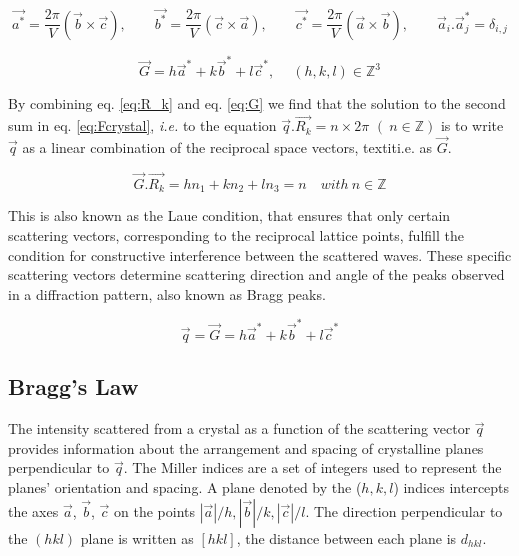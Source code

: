 \begin{equation}
    \vec{a^*}=\frac{2\pi}{V}(\vec{b}\times \vec{c}), \qquad
    \vec{b^*}=\frac{2\pi}{V}(\vec{c}\times \vec{a}), \qquad
    \vec{c^*}=\frac{2\pi}{V}(\vec{a}\times \vec{b}), \qquad
    \vec{a}_i . \vec{a}_j^* = \delta_{i,j}
\end{equation}

\begin{equation}
    \label{eq:G}
    \vec{G}=h\vec{a}^* + k\vec{b}^* + l\vec{c}^*, \quad \ (h,k,l) \in \mathbb{Z}^3
\end{equation}

By combining eq. \ref{eq:R_k} and eq. \ref{eq:G} we find that the solution to the second sum in eq. \ref{eq:Fcrystal}, \textit{i.e.} to the equation $\vec{q}.\vec{R_k} = n \times 2\pi$ $(\ n \in \mathbb{Z})$ is to write $\vec{q}$ as a linear combination of the reciprocal space vectors, textit{i.e.} as $\vec{G}$.

\begin{equation}
    \label{eq:LaueCond}
    \vec{G} . \vec{R_k} = hn_1 + kn_2 + ln_3 = n \quad  with \ n \in \mathbb{Z}
\end{equation}

This is also known as the Laue condition, that ensures that only certain scattering vectors, corresponding to the reciprocal lattice points, fulfill the condition for constructive interference between the scattered waves.
These specific scattering vectors determine scattering direction and angle of the peaks observed in a diffraction pattern, also known as Bragg peaks.

\begin{equation}
    \vec{q} = \vec{G}  = h\vec{a}^* + k\vec{b}^* + l\vec{c}^*
\end{equation}

\subsection{Bragg's Law}

The intensity scattered from a crystal as a function of the scattering vector $\vec{q}$ provides information about the arrangement and spacing of crystalline planes perpendicular to $\vec{q}$.
The Miller indices are a set of integers used to represent the planes' orientation and spacing.
A plane denoted by the ($h, k, l$) indices intercepts the axes $\vec{a}$, $\vec{b}$, $\vec{c}$ on the points $|\vec{a}|/h, |\vec{b}|/k, |\vec{c}|/l$.
The direction perpendicular to the $(hkl)$ plane is written as $[hkl]$, the distance between each plane is $d_{hkl}$.

